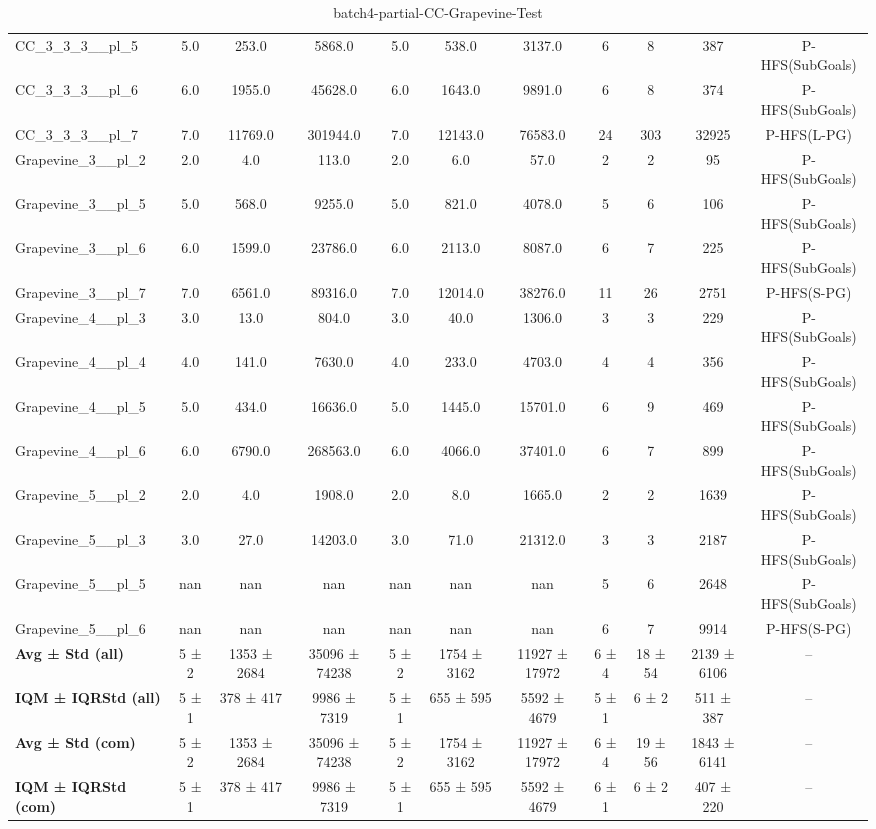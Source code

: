 \begin{table}[!ht]
\begin{tabular}{l|ccc|ccc|cccc}
CC\_3\_3\_3\_\_pl\_5 & 5.0 & 253.0 & 5868.0 & 5.0 & 538.0 & 3137.0 & 6 & 8 & 387 & P-HFS(SubGoals) \\
CC\_3\_3\_3\_\_pl\_6 & 6.0 & 1955.0 & 45628.0 & 6.0 & 1643.0 & 9891.0 & 6 & 8 & 374 & P-HFS(SubGoals) \\
CC\_3\_3\_3\_\_pl\_7 & 7.0 & 11769.0 & 301944.0 & 7.0 & 12143.0 & 76583.0 & 24 & 303 & 32925 & P-HFS(L-PG) \\
Grapevine\_3\_\_pl\_2 & 2.0 & 4.0 & 113.0 & 2.0 & 6.0 & 57.0 & 2 & 2 & 95 & P-HFS(SubGoals) \\
Grapevine\_3\_\_pl\_5 & 5.0 & 568.0 & 9255.0 & 5.0 & 821.0 & 4078.0 & 5 & 6 & 106 & P-HFS(SubGoals) \\
Grapevine\_3\_\_pl\_6 & 6.0 & 1599.0 & 23786.0 & 6.0 & 2113.0 & 8087.0 & 6 & 7 & 225 & P-HFS(SubGoals) \\
Grapevine\_3\_\_pl\_7 & 7.0 & 6561.0 & 89316.0 & 7.0 & 12014.0 & 38276.0 & 11 & 26 & 2751 & P-HFS(S-PG) \\
Grapevine\_4\_\_pl\_3 & 3.0 & 13.0 & 804.0 & 3.0 & 40.0 & 1306.0 & 3 & 3 & 229 & P-HFS(SubGoals) \\
Grapevine\_4\_\_pl\_4 & 4.0 & 141.0 & 7630.0 & 4.0 & 233.0 & 4703.0 & 4 & 4 & 356 & P-HFS(SubGoals) \\
Grapevine\_4\_\_pl\_5 & 5.0 & 434.0 & 16636.0 & 5.0 & 1445.0 & 15701.0 & 6 & 9 & 469 & P-HFS(SubGoals) \\
Grapevine\_4\_\_pl\_6 & 6.0 & 6790.0 & 268563.0 & 6.0 & 4066.0 & 37401.0 & 6 & 7 & 899 & P-HFS(SubGoals) \\
Grapevine\_5\_\_pl\_2 & 2.0 & 4.0 & 1908.0 & 2.0 & 8.0 & 1665.0 & 2 & 2 & 1639 & P-HFS(SubGoals) \\
Grapevine\_5\_\_pl\_3 & 3.0 & 27.0 & 14203.0 & 3.0 & 71.0 & 21312.0 & 3 & 3 & 2187 & P-HFS(SubGoals) \\
Grapevine\_5\_\_pl\_5 & nan & nan & nan & nan & nan & nan & 5 & 6 & 2648 & P-HFS(SubGoals) \\
Grapevine\_5\_\_pl\_6 & nan & nan & nan & nan & nan & nan & 6 & 7 & 9914 & P-HFS(S-PG) \\
\hline
\textbf{Avg ± Std (all)} & 5 ± 2 & 1353 ± 2684 & 35096 ± 74238 & 5 ± 2 & 1754 ± 3162 & 11927 ± 17972 & 6 ± 4 & 18 ± 54 & 2139 ± 6106 & -- \\
\textbf{IQM ± IQRStd (all)} & 5 ± 1 & 378 ± 417 & 9986 ± 7319 & 5 ± 1 & 655 ± 595 & 5592 ± 4679 & 5 ± 1 & 6 ± 2 & 511 ± 387 & -- \\
\textbf{Avg ± Std (com)} & 5 ± 2 & 1353 ± 2684 & 35096 ± 74238 & 5 ± 2 & 1754 ± 3162 & 11927 ± 17972 & 6 ± 4 & 19 ± 56 & 1843 ± 6141 & -- \\
\textbf{IQM ± IQRStd (com)} & 5 ± 1 & 378 ± 417 & 9986 ± 7319 & 5 ± 1 & 655 ± 595 & 5592 ± 4679 & 6 ± 1 & 6 ± 2 & 407 ± 220 & -- \\
\end{tabular}
\caption{batch4-partial-CC-Grapevine-Test}
\label{tab:batch4_partial_CC-Grapevine_comparison_test}
\end{table}

